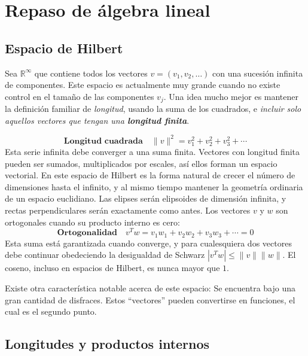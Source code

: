 \documentclass[a4paper]{memoir}
\begin{document}
\chapter{Repaso de álgebra lineal}

\section{Espacio de Hilbert}

Sea $\mathbb{R}^\infty$ que contiene todos los vectores $v=(v_1,v_2,\ldots)$ con una sucesión infinita de componentes. Este espacio es actualmente muy grande cuando no existe control en el tamaño de las componentes $v_j$. Una idea mucho mejor es mantener la definición familiar de \emph{longitud}, usando la suma de los cuadrados, e \emph{incluir solo aquellos vectores que tengan una \textbf{longitud finita}}.

\begin{equation}
  \label{eq:1}
  \textbf{Longitud cuadrada}\quad \|v\|^2= v_1^2+v_2^2+v_3^2+\cdots
\end{equation}
Esta serie infinita debe converger a una suma finita. Vectores con longitud finita pueden ser sumados, multiplicados por escales, así ellos forman un espacio vectorial. En este espacio de Hilbert es la forma natural de crecer el número de dimensiones hasta el infinito, y al mismo tiempo mantener la geometría ordinaria de un espacio euclidiano. Las elipses serán elipsoides de dimensión infinita, y rectas perpendiculares serán exactamente como antes. Los vectores $v$ y $w$ son ortogonales cuando su producto interno es cero:
\begin{equation}
  \label{eq:1}
  \mathbf{Ortogonalidad}\quad v^Tw=v_1w_1+v_2w_2+v_3w_3+\cdots =0
\end{equation}
Esta suma está garantizada cuando converge, y para cualesquiera dos vectores debe continuar obedeciendo la desigualdad de Schwarz $|v^Tw|\le \|v\|\|w\|$. El coseno, incluso en espacios de Hilbert, es nunca mayor que $1$.

Existe otra característica notable acerca de este espacio: Se encuentra bajo una gran cantidad de disfraces. Estos ``vectores'' pueden convertirse en funciones, el cual es el segundo punto.

\section{Longitudes y productos internos}
\end{document}
